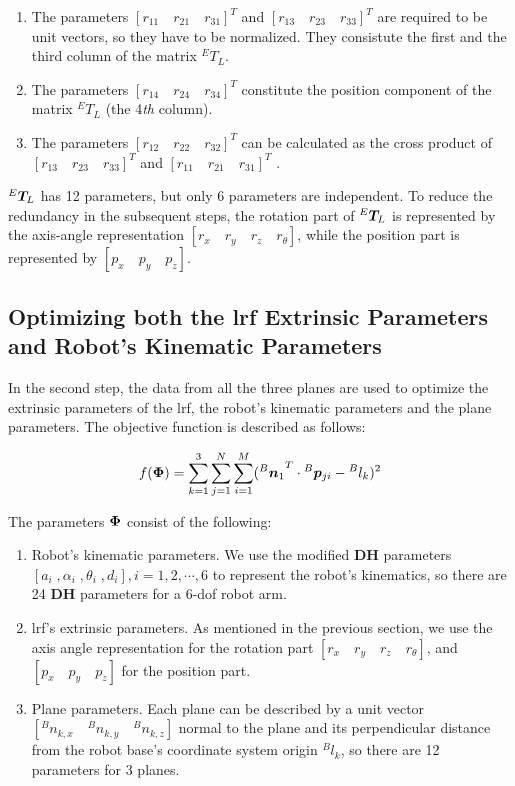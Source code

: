\begin{enumerate}
\item The parameters $[r_{11} \quad r_{21} \quad r_{31}]^T$ and $[r_{13} \quad r_{23} \quad r_{33}]^T$ are required to be unit vectors, so they have to be normalized. They consistute the first and the third column of the matrix ${^E}T_L$.
\item The parameters $[r_{14} \quad r_{24} \quad r_{34}]^T$ constitute the position component of the matrix ${^E}T_L$ (the 4\textit{th} column).
\item The parameters $[r_{12} \quad r_{22} \quad r_{32}]^T$ can be calculated as the cross product of  $[r_{13} \quad r_{23} \quad r_{33}]^T$ and $[r_{11} \quad r_{21} \quad r_{31}]^T$ .
\end{enumerate}

${^E}\vb*{T}_L$ has 12 parameters, but only 6 parameters are independent. To reduce the redundancy in the subsequent steps, the rotation part of ${^E}\vb*{T}_L$ is represented by the axis-angle representation $[r_x \quad r_y \quad r_z \quad r_{\theta}]$, while the position part is represented by  $[p_x \quad p_y\quad p_z]$.


\subsection{Optimizing both the \ac{lrf} Extrinsic Parameters and Robot's Kinematic Parameters}
\label{sec:second_step}
In the second step, the data from all the three planes are used to optimize the extrinsic parameters of the \ac{lrf}, the robot's kinematic parameters and the plane parameters. The objective function is described as follows:

\begin{equation}
 f (\vb*{\Phi}) =  \sum_{k=1}^{3} \sum_{j=1}^{N} \sum_{i=1}^{M} ({{^B}\vb*{n}_1}^T \cdot {^B}\vb*{p}_{ji} - {^B}l_k)^2
\end{equation}

The parameters $\vb*{\Phi}$ consist of the following:
\begin{enumerate}
\item Robot's kinematic parameters. We use the modified \textbf{DH} parameters \cite{Hayati1985} $[a_i \;, \alpha_i \;,\theta_i \;,d_i], i=1, 2, \cdots ,6$ to represent the robot's kinematics, so there are 24 \textbf{DH} parameters for a 6-\ac{dof} robot arm. 
\item \ac{lrf}'s extrinsic parameters. As mentioned in the previous section, we use the axis angle representation for the rotation part $[r_x \quad r_y \quad r_z \quad r_{\theta}]$, and $[p_x \quad p_y\quad p_z]$ for the position part. 
\item Plane parameters. Each plane can be described by a unit vector $[{^B}n_{k,x}\quad {^B}n_{k,y}\quad {^B}n_{k,z}]$ normal to the plane and its perpendicular distance from the robot base's coordinate system origin ${^B}l_{k}$, so there are 12 parameters for 3 planes.
\end{enumerate}

